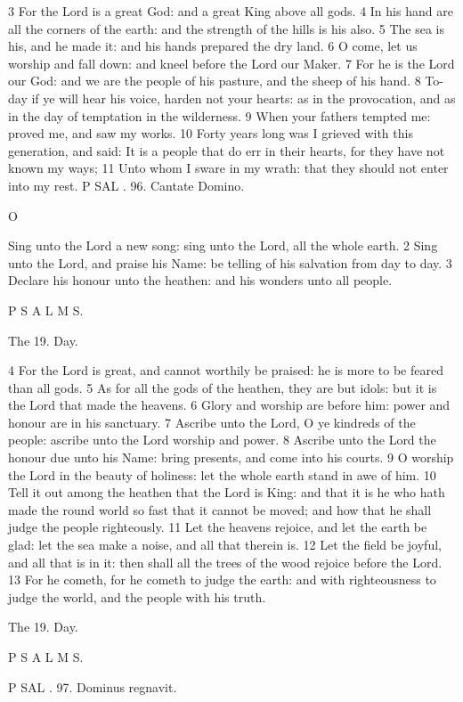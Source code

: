 3 For the Lord is a great God: and a great King above all gods. 4 In his hand are all the corners of the earth: and the strength of the hills is his also. 5 The sea is his, and he made it: and his hands prepared the dry land. 6 O come, let us worship and fall down: and kneel before the Lord our Maker. 7 For he is the Lord our God: and we are the people of his pasture, and the sheep of his hand. 8 To-day if ye will hear his voice, harden not your hearts: as in the provocation, and as in the day of temptation in the wilderness. 9 When your fathers tempted me: proved me, and saw my works. 10 Forty years long was I grieved with this generation, and said: It is a people that do err in their hearts, for they have not known my ways; 11 Unto whom I sware in my wrath: that they should not enter into my rest. P SAL . 96. Cantate Domino.

O

Sing unto the Lord a new song: sing unto the Lord, all the whole earth. 2 Sing unto the Lord, and praise his Name: be telling of his salvation from day to day. 3 Declare his honour unto the heathen: and his wonders unto all people.

P S A L M S.

The 19. Day.

4 For the Lord is great, and cannot worthily be praised: he is more to be feared than all gods. 5 As for all the gods of the heathen, they are but idols: but it is the Lord that made the heavens. 6 Glory and worship are before him: power and honour are in his sanctuary. 7 Ascribe unto the Lord, O ye kindreds of the people: ascribe unto the Lord worship and power. 8 Ascribe unto the Lord the honour due unto his Name: bring presents, and come into his courts. 9 O worship the Lord in the beauty of holiness: let the whole earth stand in awe of him. 10 Tell it out among the heathen that the Lord is King: and that it is he who hath made the round world so fast that it cannot be moved; and how that he shall judge the people righteously. 11 Let the heavens rejoice, and let the earth be glad: let the sea make a noise, and all that therein is. 12 Let the field be joyful, and all that is in it: then shall all the trees of the wood rejoice before the Lord. 13 For he cometh, for he cometh to judge the earth: and with righteousness to judge the world, and the people with his truth.

The 19. Day.

P S A L M S.

P SAL . 97. Dominus regnavit.

